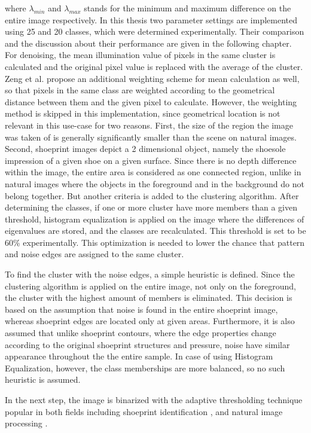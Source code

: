 \documentclass[draft,final]{vutinfth} %
\begin{document}
where $\lambda_{min}$ and $\lambda_{max}$ stands for the minimum and maximum difference on the entire image respectively.
In this thesis two parameter settings are implemented using 25 and 20 classes, which were determined experimentally.
Their comparison and the discussion about their performance are given in the following chapter.
For denoising, the mean illumination value of pixels in the same cluster is calculated and the original pixel value is replaced with the average of the cluster.
Zeng et al. \cite{zeng2011region} propose an additional weighting scheme for mean calculation as well, so that pixels in the same class are weighted according to the geometrical distance between them and the given pixel to calculate.
However, the weighting method is skipped in this implementation, since geometrical location is not relevant in this use-case for two reasons.
First, the size of the region the image was taken of is generally significantly smaller than the scene on natural images.
Second, shoeprint images depict a 2 dimensional object, namely the shoesole impression of a given shoe on a given surface. 
Since there is no depth difference within the image, the entire area is considered as one connected region, unlike in natural images where the objects in the foreground and in the background do not belong together.
But another criteria is added to the clustering algorithm.
After determining the classes, if one or more cluster have more members than a given threshold, histogram equalization is applied on the image where the differences of eigenvalues are stored, and the classes are recalculated.
This threshold is set to be 60\% experimentally.
This optimization is needed to lower the chance that pattern and noise edges are assigned to the same cluster. 
\par
To find  the cluster with the noise edges, a simple heuristic is defined.
Since the clustering algorithm is applied on the entire image, not only on the foreground, the cluster with the highest amount of members is eliminated.
This decision is based on the assumption that noise is found in the entire shoeprint image, whereas shoeprint edges are located only at given areas.
Furthermore, it is also assumed that unlike shoeprint contours, where the edge properties change according to the original shoeprint structures and pressure, noise have similar appearance throughout the the entire sample.
In case of using Histogram Equalization, however, the class memberships are more balanced, so no such heuristic is assumed.
\par
In the next step, the image is binarized with the adaptive thresholding technique \cite{laine1996multiscale} popular in both fields including shoeprint identification  \cite{wang2014automatic}, \cite{li2014retrieval} and natural image processing \cite{xu2016image}.
\end{document}
